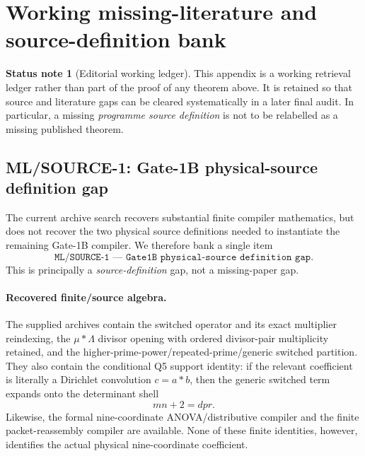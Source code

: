 \documentclass[11pt]{article}
\theoremstyle{definition}
\newtheorem{status}[status]{Status note}
\newcommand{\1}{\mathbf 1}
\begin{document}
\section{Working missing-literature and source-definition bank}
\label{app:missing-source-bank}

\begin{status}[Editorial working ledger]
This appendix is a working retrieval ledger rather than part of the proof of
any theorem above.  It is retained so that source and literature gaps can be
cleared systematically in a later final audit.  In particular, a missing
\emph{programme source definition} is not to be relabelled as a missing
published theorem.
\end{status}

\subsection{ML/SOURCE-1: Gate-1B physical-source definition gap}
\label{app:ml-source-1}

The current archive search recovers substantial finite compiler mathematics,
but does not recover the two physical source definitions needed to instantiate
the remaining Gate-1B compiler.  We therefore bank a single item
\[
   \boxed{\texttt{ML/SOURCE-1 --- Gate1B physical-source definition gap}}.
\]
This is principally a \emph{source-definition} gap, not a missing-paper gap.

\paragraph{Recovered finite/source algebra.}
The supplied archives contain the switched operator and its exact multiplier
reindexing, the $\mu*\Lambda$ divisor opening with ordered divisor-pair
multiplicity retained, and the higher-prime-power/repeated-prime/generic
switched partition.  They also contain the conditional Q5 support identity:
if the relevant coefficient is literally a Dirichlet convolution $c=a*b$,
then the generic switched term expands onto the determinant shell
\[
        mn+2=dpr.
\]
Likewise, the formal nine-coordinate ANOVA/distributive compiler and the
finite packet-reassembly compiler are available.  None of these finite
identities, however, identifies the actual physical nine-coordinate
coefficient.
\end{document}
